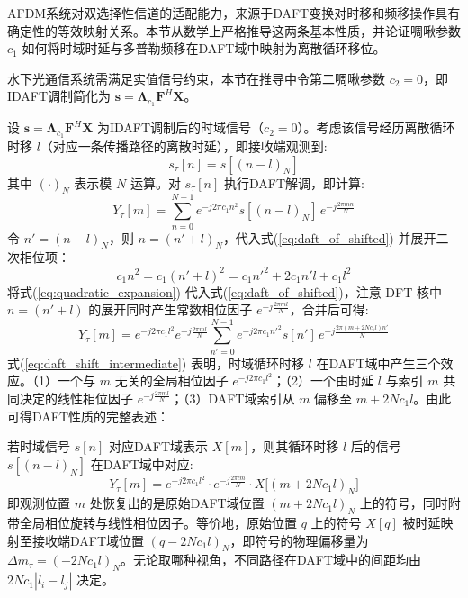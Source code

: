 AFDM系统对双选择性信道的适配能力，来源于DAFT变换对时移和频移操作具有确定性的等效映射关系。本节从数学上严格推导这两条基本性质，并论证啁啾参数 $c_1$ 如何将时域时延与多普勒频移在DAFT域中映射为离散循环移位。

水下光通信系统需满足实值信号约束，本节在推导中令第二啁啾参数 $c_2=0$，即IDAFT调制简化为 $\mathbf{s} = \boldsymbol{\Lambda}_{c_1} \mathbf{F}^{H} \mathbf{X}$。


设 $\mathbf{s} = \boldsymbol{\Lambda}_{c_1} \mathbf{F}^{H} \mathbf{X}$ 为IDAFT调制后的时域信号（$c_2=0$）。考虑该信号经历离散循环时移 $l$（对应一条传播路径的离散时延），即接收端观测到:
\begin{equation}
    s_{\tau}[n] = s[(n-l)_N]
    \label{eq:time_shift_signal}
\end{equation}
其中 $(\cdot)_N$ 表示模 $N$ 运算。对 $s_{\tau}[n]$ 执行DAFT解调，即计算:
\begin{equation}
    Y_{\tau}[m] = \sum_{n=0}^{N-1} e^{-j2\pi c_1 n^2} s[(n-l)_N] \, e^{-j\frac{2\pi mn}{N}}
    \label{eq:daft_of_shifted}
\end{equation}
令 $n' = (n-l)_N$，则 $n = (n'+l)_N$，代入式(\ref{eq:daft_of_shifted}) 并展开二次相位项：
\begin{equation}
    c_1 n^2 = c_1(n'+l)^2 = c_1 {n'}^2 + 2c_1 n' l + c_1 l^2
    \label{eq:quadratic_expansion}
\end{equation}
将式(\ref{eq:quadratic_expansion}) 代入式(\ref{eq:daft_of_shifted})，注意 DFT 核中 $n=(n'+l)$ 的展开同时产生常数相位因子 $e^{-j\frac{2\pi ml}{N}}$，合并后可得:
\begin{equation}
    Y_{\tau}[m] = e^{-j2\pi c_1 l^2} e^{-j\frac{2\pi ml}{N}} \sum_{n'=0}^{N-1} e^{-j2\pi c_1 {n'}^2} s[n'] \, e^{-j\frac{2\pi (m+2Nc_1 l) n'}{N}}
    \label{eq:daft_shift_intermediate}
\end{equation}
式(\ref{eq:daft_shift_intermediate}) 表明，时域循环时移 $l$ 在DAFT域中产生三个效应。（1）一个与 $m$ 无关的全局相位因子 $e^{-j2\pi c_1 l^2}$；（2）一个由时延 $l$ 与索引 $m$ 共同决定的线性相位因子 $e^{-j\frac{2\pi ml}{N}}$；（3）DAFT域索引从 $m$ 偏移至 $m + 2Nc_1 l$。由此可得DAFT性质的完整表述：

若时域信号 $s[n]$ 对应DAFT域表示 $X[m]$，则其循环时移 $l$ 后的信号 $s[(n-l)_N]$ 在DAFT域中对应:
\begin{equation}
    Y_{\tau}[m] = e^{-j2\pi c_1 l^2} \cdot e^{-j\frac{2\pi l m}{N}} \cdot X\bigl[(m + 2Nc_1 l)_N\bigr]
    \label{eq:daft_time_shift_property}
\end{equation}
即观测位置 $m$ 处恢复出的是原始DAFT域位置 $(m+2Nc_1 l)_N$ 上的符号，同时附带全局相位旋转与线性相位因子。等价地，原始位置 $q$ 上的符号 $X[q]$ 被时延映射至接收端DAFT域位置 $(q-2Nc_1 l)_N$，即符号的物理偏移量为 $\Delta m_{\tau} = (-2Nc_1 l)_N$。无论取哪种视角，不同路径在DAFT域中的间距均由 $2Nc_1 |l_i - l_j|$ 决定。

